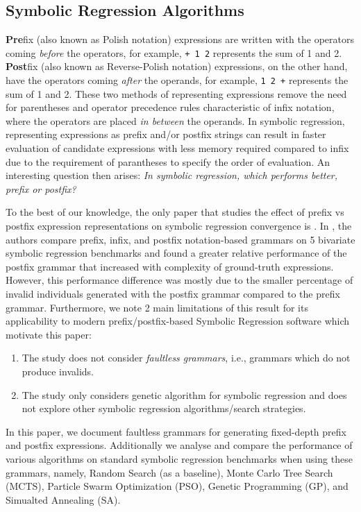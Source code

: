 \documentclass[runningheads]{llncs}
\begin{document}
\subsection{Symbolic Regression Algorithms}
\textbf{Pre}fix (also known as Polish notation) expressions are written with the operators coming \emph{before} the operators, for example, \texttt{+ 1 2} represents the sum of 1 and 2. \textbf{Post}fix (also known as Reverse-Polish notation) expressions, on the other hand, have the operators coming \emph{after} the operands, for example, \texttt{1 2 +} represents the sum of 1 and 2. These two methods of representing expressions remove the need for parentheses and operator precedence rules characteristic of infix notation, where the operators are placed \emph{in between} the operands. In symbolic regression, representing expressions as prefix and/or postfix strings can result in faster evaluation of candidate expressions with less memory required compared to infix due to the requirement of parantheses to specify the order of evaluation. An interesting question then arises: \emph{In symbolic regression, which performs better, prefix or postfix?}
\par To the best of our knowledge, the only paper that studies the effect of prefix vs postfix expression representations on symbolic regression convergence is \cite{hemberg2008pre}.  In \cite{hemberg2008pre}, the authors compare prefix, infix, and postfix notation-based grammars on 5 bivariate symbolic regression benchmarks and found a greater relative performance of the postfix grammar that increased with complexity of ground-truth expressions. 
However, this performance difference was mostly due to the smaller percentage of invalid individuals generated with the postfix grammar compared to the prefix grammar.  
Furthermore, we note 2 main limitations of this result for its applicability to modern prefix/postfix-based Symbolic Regression software which motivate this paper:
\begin{enumerate}
\item The study does not consider \emph{faultless grammars}, i.e., grammars which do not produce invalids.
\item The study only considers genetic algorithm for symbolic regression and does not explore other symbolic regression algorithms/search strategies. 
\end{enumerate}
In this paper, we document faultless grammars for generating fixed-depth prefix and postfix expressions. Additionally we analyse and compare the performance of various algorithms on standard symbolic regression benchmarks when using these grammars, namely, Random Search (as a baseline), Monte Carlo Tree Search (MCTS), Particle Swarm Optimization (PSO), Genetic Programming (GP), and Simualted Annealing (SA). 
\end{document}
